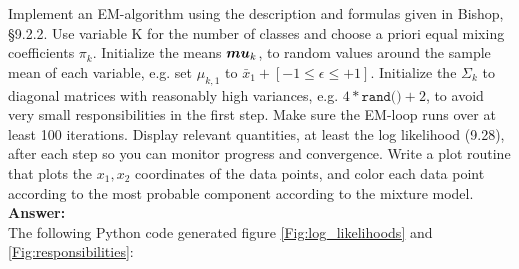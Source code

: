 \documentclass[a4paper]{article}
\begin{document}
Implement an EM-algorithm using the description and formulas given in Bishop, §9.2.2. Use variable K for the number of classes and choose a priori equal mixing coefficients $\pi_k$. Initialize the means $\boldsymbol{\\mu}_k$, to random values around the sample mean of each variable, e.g. set $\mu_{k,1}$ to  $\bar{x}_1 + [-1 \leq \epsilon \leq +1]$. Initialize the $\Sigma_k$ to diagonal matrices with reasonably high variances, e.g. $4*\texttt{rand()}+2$, to avoid very small responsibilities in the first step. Make sure the EM-loop runs over at least 100 iterations. Display relevant quantities, at least the log likelihood (9.28), after each step so you can monitor progress and convergence. Write a plot routine that plots the $x_1, x_2$ coordinates of the data points, and color each data point according to the most probable component according to the mixture model.\\

\textbf{Answer:}\\

The following Python code generated figure \ref{Fig:log_likelihoods} and \ref{Fig:responsibilities}:
\end{document}
